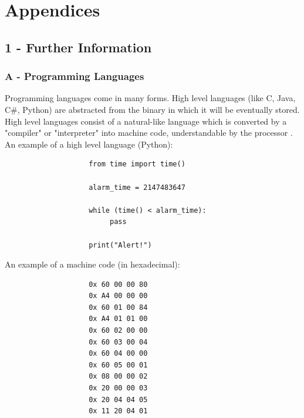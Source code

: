 \documentclass[twoside,a4]{report}
\def\achapter{preamble}  %
\begin{document}
	\newpage
	\def\achapter{Bibliography}
	
	



\appendix


\chapter*{Appendices}
\def\achapter{Appendices}
\setcounter{page}{1}
\setcounter{section}{1}
\section{1 - Further Information}
\subsection{A -  Programming Languages}
Programming languages come in many forms. High level languages (like C, Java, C\#, Python) are abstracted from the binary in which it will be eventually stored. High level languages consist of a natural-like language which is converted by a "compiler" or "interpreter" into machine code, understandable by the processor \cite{proglanghighlow}.\newline \newline  \noindent
\noindent
An example of a high level language (Python):
\begin{verbatim}
                    from time import time()

                    alarm_time = 2147483647

                    while (time() < alarm_time):
                         pass

                    print("Alert!")
\end{verbatim}
An example of a machine code (in hexadecimal)\cite{proglangmachex}:
\begin{verbatim}
                    0x 60 00 00 80
                    0x A4 00 00 00
                    0x 60 01 00 84
                    0x A4 01 01 00
                    0x 60 02 00 00
                    0x 60 03 00 04
                    0x 60 04 00 00
                    0x 60 05 00 01
                    0x 08 00 00 02
                    0x 20 00 00 03
                    0x 20 04 04 05
                    0x 11 20 04 01
\end{verbatim}
\end{document}

